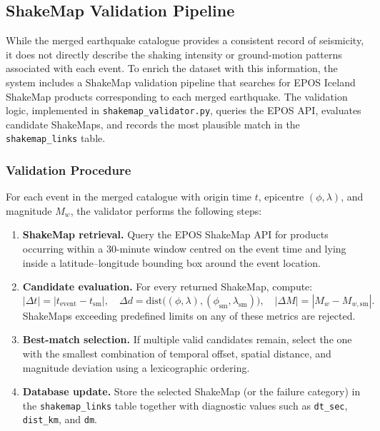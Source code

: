 \documentclass[12pt]{article}
\begin{document}
\subsection{ShakeMap Validation Pipeline}
\label{subsec:shakemap}

While the merged earthquake catalogue provides a consistent record of seismicity, it does not directly describe the shaking intensity or ground-motion patterns associated with each event. To enrich the dataset with this information, the system includes a ShakeMap validation pipeline that searches for EPOS Iceland ShakeMap products corresponding to each merged earthquake. The validation logic, implemented in \texttt{shakemap\_validator.py}, queries the EPOS API, evaluates candidate ShakeMaps, and records the most plausible match in the \texttt{shakemap\_links} table.

\subsubsection*{Validation Procedure}

For each event in the merged catalogue with origin time $t$, epicentre $(\phi, \lambda)$, and magnitude $M_w$, the validator performs the following steps:

\begin{enumerate}
    \item \textbf{ShakeMap retrieval.} Query the EPOS ShakeMap API for products occurring within a 30-minute window centred on the event time and lying inside a latitude--longitude bounding box around the event location.
    \item \textbf{Candidate evaluation.} For every returned ShakeMap, compute:
    \[
    |\Delta t| = |t_{\text{event}} - t_{\text{sm}}|, \quad 
    \Delta d = \text{dist}\big((\phi,\lambda), (\phi_{\text{sm}},\lambda_{\text{sm}})\big), \quad
    |\Delta M| = |M_w - M_{w,\text{sm}}|.
    \]
    ShakeMaps exceeding predefined limits on any of these metrics are rejected.
    \item \textbf{Best-match selection.} If multiple valid candidates remain, select the one with the smallest combination of temporal offset, spatial distance, and magnitude deviation using a lexicographic ordering.
    \item \textbf{Database update.} Store the selected ShakeMap (or the failure category) in the \texttt{shakemap\_links} table together with diagnostic values such as \texttt{dt\_sec}, \texttt{dist\_km}, and \texttt{dm}.
\end{enumerate}
\end{document}
